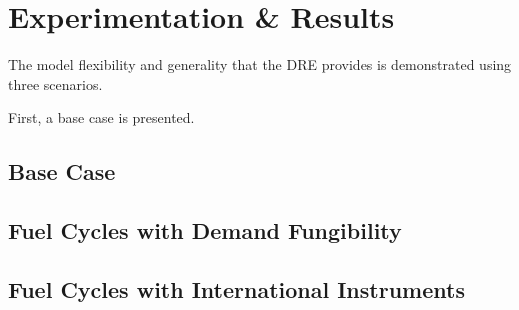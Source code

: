\section{Experimentation \& Results}\label{results}

The model flexibility and generality that the DRE provides is demonstrated using
three scenarios. 

First, a base case is presented. 

\subsection{Base Case}

\subsection{Fuel Cycles with Demand Fungibility}





\subsection{Fuel Cycles with International Instruments}




